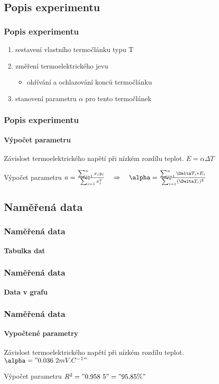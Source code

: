 \documentclass[smaller,aspectratio=1610,handout]{beamer}
\newcommand\sumi{\sum_{i=1}^n}
\begin{document}
\subsection{Popis experimentu}
\begin{frame}
	\frametitle{Popis experimentu}
	\begin{enumerate}
		\item sestavení vlastního termočlánku typu T
		\item změření termoelektrického jevu
			\begin{itemize}
				\item ohřívání a ochlazování konců termočlánku
			\end{itemize}
		\item stanovení parametru $\alpha$ pro tento termočlánek
	\end{enumerate}
\end{frame}

\begin{frame}
	\frametitle{Popis experimentu}
	\framesubtitle{Výpočet parametru}
	\begin{block}{Závislost termoelektrického napětí při nízkém rozdílu teplot.}
		\centering $E=\alpha\Delta T$
	\end{block}
	\begin{block}{Výpočet parametru}
		\centering $a=\frac{\sumi x_iy_i}{\sumi x_i^2}
		\ztoho \alpha=\frac{\sumi\Delta T_i*E_i}{\sumi (\Delta T_i)^2}$
	\end{block}
\end{frame}

\subsection{Naměřená data}
\begin{frame}
	\frametitle{Naměřená data}
	\framesubtitle{Tabulka dat}
	\hspace{0cm}\vfill
	\footnotesize
	
	\vfill
\end{frame}

\begin{frame}
	\frametitle{Naměřená data}
	\framesubtitle{Data v grafu}
	\hspace{0cm}\vfill
	\small
	\vfill
\end{frame}
\begin{frame}
	\frametitle{Naměřená data}
	\framesubtitle{Vypočtené parametry}
	\begin{block}{Závislost termoelektrického napětí při nízkém rozdílu teplot.}
		\centering $\alpha = "0.036~2 mV.C^{-1}"$
	\end{block}
	\begin{block}{Výpočet parametru}
		\centering $R^2="0.958~5"="95.85 \%"$
	\end{block}
\end{frame}
\end{document}
